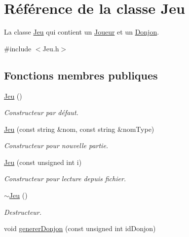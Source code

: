 \hypertarget{classJeu}{}\section{Référence de la classe Jeu}
\label{classJeu}


La classe \mbox{\hyperlink{classJeu}{Jeu}} qui contient un \mbox{\hyperlink{classJoueur}{Joueur}} et un \mbox{\hyperlink{classDonjon}{Donjon}}.  




{\ttfamily \#include $<$Jeu.\+h$>$}

\subsection*{Fonctions membres publiques}
\begin{DoxyCompactItemize}
\item 
\mbox{\label{classJeu_acc5795ee00edf75516d3dfe65be3e6d6}} 
\mbox{\hyperlink{classJeu_acc5795ee00edf75516d3dfe65be3e6d6}{Jeu}} ()
\begin{DoxyCompactList}\small\item\em Constructeur par défaut. \end{DoxyCompactList}\item 
\mbox{\hyperlink{classJeu_a0f4f3c83ee5283ffa550099635f992f7}{Jeu}} (const string \&nom, const string \&nom\+Type)
\begin{DoxyCompactList}\small\item\em Constructeur pour nouvelle partie. \end{DoxyCompactList}\item 
\mbox{\hyperlink{classJeu_a837f519e29a5e4a437ef1d5af2601a7e}{Jeu}} (const unsigned int i)
\begin{DoxyCompactList}\small\item\em Constructeur pour lecture depuis fichier. \end{DoxyCompactList}\item 
\mbox{\label{classJeu_a9cd19e73df169d7f09397be61ba8548c}} 
\mbox{\hyperlink{classJeu_a9cd19e73df169d7f09397be61ba8548c}{$\sim$\+Jeu}} ()
\begin{DoxyCompactList}\small\item\em Destructeur. \end{DoxyCompactList}\item 
void \mbox{\hyperlink{classJeu_ad47ce612c294306092ce2e3c726934e3}{generer\+Donjon}} (const unsigned int id\+Donjon)

\end{DoxyCompactItemize}
